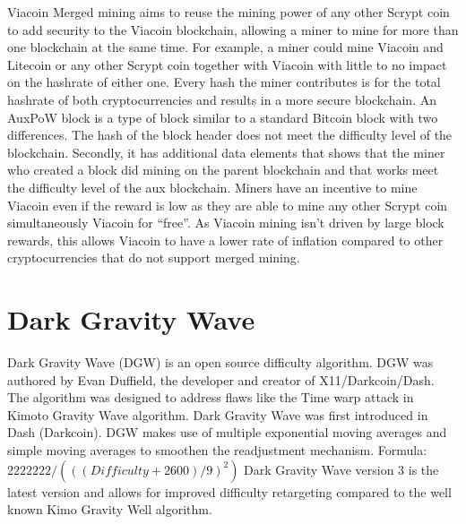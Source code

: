 \documentclass{article}
\begin{document}
Viacoin \cite{auxpow}Merged mining aims to reuse the mining power of any other \cite{scrypt}Scrypt coin
to add security to the Viacoin blockchain,
allowing a miner to mine for more than one blockchain at the same time. For example, a miner
could mine Viacoin and Litecoin or any other Scrypt coin together with Viacoin with little to no impact on the hashrate of either one.
\newline \newline \noindent
Every hash the miner contributes is for the total hashrate of both
cryptocurrencies and results in a more secure blockchain.
An AuxPoW block is a type of block similar to a standard Bitcoin block with two
differences. The hash of the block header does not meet the difficulty level of the
blockchain. Secondly, it has additional data elements that shows that the miner
who created a block did mining on the parent blockchain and that works meet
the difficulty level of the aux blockchain.
\newline \newline \noindent
Miners have an incentive to mine Viacoin
even if the reward is low as they are able to mine any other Scrypt
coin simultaneously Viacoin for “free”. As Viacoin mining isn't driven by large block rewards,
this allows Viacoin to have a lower rate of inflation
compared to other cryptocurrencies that do not support merged mining.
\newpage

\section{Dark Gravity Wave}\label{sec: Dark Gravity Wave}
\cite{darkGravityWave}Dark Gravity Wave (DGW) is an open source difficulty algorithm. DGW was
authored by Evan Duffield, the developer and creator of X11/Darkcoin/Dash.
The algorithm was designed to address flaws like the Time warp attack in Kimoto
Gravity Wave algorithm.
\newline \newline \noindent
Dark Gravity Wave was first introduced in Dash
(Darkcoin). DGW makes use of multiple exponential moving averages and simple
moving averages to smoothen the readjustment mechanism.
\newline Formula: \newline \newline
$2222222/ (((Difficulty+2600)/9)^2)$ \newline \newline \noindent
Dark Gravity Wave version 3 is the latest version and allows for improved difficulty retargeting compared
to the well known Kimo Gravity Well algorithm.
\end{document}
